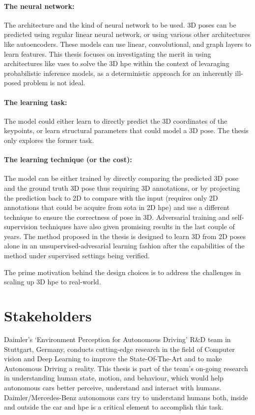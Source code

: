 \paragraph{The neural network:} The architecture and the kind of neural network to be used. 3D poses can be predicted using regular linear neural network, or using various other architectures like autoencoders. These models can use linear, convolutional, and graph layers to learn features. This thesis focuses on investigating the merit in using architectures like \acp{vae} to solve the 3D \ac{hpe} within the context of levaraging probabilistic inference models, as a deterministic approach for an inherently ill-posed problem is not ideal.

\paragraph{The learning task:} The model could either learn to directly predict the 3D coordinates of the keypoints, or learn structural parameters that could model a 3D pose. The thesis only explores the former task.

\paragraph{The learning technique (or the cost):} The model can be either trained by directly comparing the predicted 3D pose and the ground truth 3D pose thus requiring 3D annotations, or by projecting the prediction back to 2D to compare with the input (requires only 2D annotations that could be acquire from \ac{sota} in 2D \ac{hpe}) and use a different technique to ensure the correctness of pose in 3D. Adversarial training and self-supervision techniques have also given promising results in the last couple of years. The method proposed in the thesis is designed to learn 3D from 2D poses alone in an unsupervised-advesarial learning fashion after the capabilities of the method under supervised settings being verified.

The prime motivation behind the design choices is to address the challenges in scaling up 3D \ac{hpe} to real-world.

\section{Stakeholders}
\label{sec:stakeholders}
Daimler’s ‘Environment Perception for Autonomous Driving’ R\&D team in Stuttgart, Germany, conducts cutting-edge research in the field of Computer vision and Deep Learning to improve the State-Of-The-Art and to make Autonomous Driving a reality. This thesis is part of the team’s on-going research in understanding human state, motion, and behaviour, which would help autonomous cars better perceive, understand and interact with humans. Daimler/Mercedes-Benz autonomous cars try to understand humans both, inside and outside the car and \ac{hpe} is a critical element to accomplish this task.

